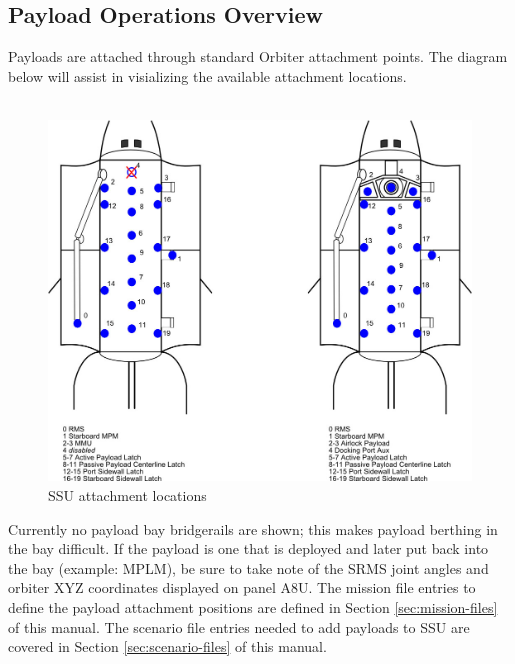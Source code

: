 \documentclass[13pt]{article}
\begin{document}
\subsection{Payload Operations Overview}
Payloads are attached through standard Orbiter attachment points. The diagram below will assist in visializing the available attachment locations.\\
\\
\begin{figure}[H]
  \centering
  \includegraphics[width=1\textwidth]{SSU_Attachments.png}
  \caption{SSU attachment locations}
  \label{fig:SSUAttachments}
\end{figure}
Currently no payload bay bridgerails are shown; this makes payload berthing in the bay difficult. If the payload is one that is deployed and later put back into the bay (example: MPLM), be sure to take note of the SRMS joint angles and orbiter XYZ coordinates displayed on panel A8U.
The mission file entries to define the payload attachment positions are defined in Section \ref{sec:mission-files} of this manual.
The scenario file entries needed to add payloads to SSU are covered in Section \ref{sec:scenario-files} of this manual. \\

\newpage

\newpage

\newpage

\newpage

\end{document}
